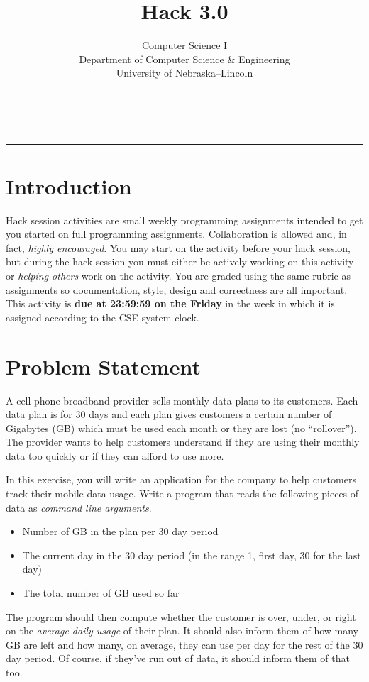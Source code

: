 \documentclass[12pt]{scrartcl}
\title{Hack 3.0}\let\Title\@title
\subtitle{Computer Science I\\
{\small
\vskip1cm
Department of Computer Science \& Engineering \\
University of Nebraska--Lincoln}
\vskip-1cm}
\date{~}
\begin{document}
\maketitle

\hrule

\section*{Introduction}

Hack session activities are small weekly programming assignments intended
to get you started on full programming assignments.  Collaboration is allowed
and, in fact, \emph{highly encouraged}.  You may start on the activity before
your hack session, but during the hack session you must either be actively 
working on this activity or \emph{helping others} work on the activity.
You are graded using the same rubric as assignments so documentation, style, 
design and correctness are all important.  This activity is \textbf{due 
at 23:59:59 on the Friday} in the week in which it is assigned according 
to the CSE system clock.


\section*{Problem Statement}

A cell phone broadband provider sells monthly data plans to its
customers.  Each data plan is for 30 days and each plan gives
customers a certain number of Gigabytes (GB) which must be used 
each month or they are lost (no ``rollover'').  The provider wants
to help customers understand if they are using their monthly data
too quickly or if they can afford to use more.

In this exercise, you will write an application for the company
to help customers track their mobile data usage.  Write a program
that reads the following pieces of data as \emph{command line arguments}.
\begin{itemize}
  \item Number of GB in the plan per 30 day period
  \item The current day in the 30 day period (in the range 1, first day, 
  30 for the last day)
  \item The total number of GB used so far
\end{itemize}
The program should then compute whether the customer is over, 
under, or right on the \emph{average daily usage} of their plan.  
It should also inform them of how many GB are left and how many, 
on average, they can use per day for the rest of the 30 day period.  
Of course, if they've run out of data, it should inform them of that 
too.
\end{document}

